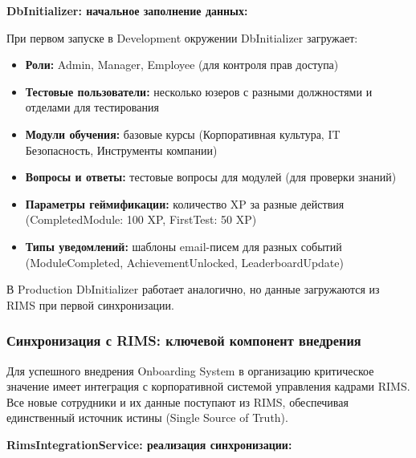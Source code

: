 \textbf{DbInitializer: начальное заполнение данных:}

При первом запуске в Development окружении DbInitializer загружает:

\begin{itemize}
	\item \textbf{Роли:} Admin, Manager, Employee (для контроля прав доступа)
	\item \textbf{Тестовые пользователи:} несколько юзеров с разными должностями и отделами для тестирования
	\item \textbf{Модули обучения:} базовые курсы (Корпоративная культура, IT Безопасность, Инструменты компании)
	\item \textbf{Вопросы и ответы:} тестовые вопросы для модулей (для проверки знаний)
	\item \textbf{Параметры геймификации:} количество XP за разные действия (CompletedModule: 100 XP, FirstTest: 50 XP)
	\item \textbf{Типы уведомлений:} шаблоны email-писем для разных событий (ModuleCompleted, AchievementUnlocked, LeaderboardUpdate)
\end{itemize}

В Production DbInitializer работает аналогично, но данные загружаются из RIMS при первой синхронизации.

\subsubsection*{Синхронизация с RIMS: ключевой компонент внедрения}

Для успешного внедрения Onboarding System в организацию критическое значение имеет интеграция с корпоративной системой управления кадрами RIMS. Все новые сотрудники и их данные поступают из RIMS, обеспечивая единственный источник истины (Single Source of Truth).

\textbf{RimsIntegrationService: реализация синхронизации:}

